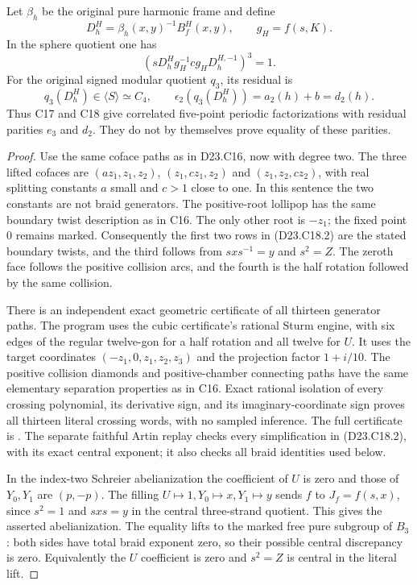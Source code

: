 Let $\beta_h$ be the original pure harmonic frame and define
\[
 D^H_h=\beta_h(x,y)^{-1}B^H_f(x,y),\qquad g_H=f(s,K).
\]
In the sphere quotient one has
\[
 \boxed{\quad
 (sD^H_hg_H^{-1}c g_HD^{H,-1}_h)^3=1.
 \quad}
\tag{D23.C18.5}
\]
For the original signed modular quotient $q_3$, its residual is
\[
 q_3(D^H_h)\in\langle S\rangle\simeq C_4,
 \qquad
 \epsilon_2(q_3(D^H_h))=a_2(h)+b=d_2(h).
\tag{D23.C18.6}
\]
Thus C17 and C18 give correlated five-point periodic
factorizations with residual parities $e_3$ and $d_2$.
They do not by themselves prove equality of these parities.

\begin{proof}
Use the same coface paths as in D23.C16, now with degree two.
The three lifted cofaces are
$(az_1,z_1,z_2)$, $(z_1,cz_1,z_2)$ and
$(z_1,z_2,cz_2)$, with real splitting constants $a$ small and
$c>1$ close to one. In this sentence the two constants are not
braid generators. The positive-root lollipop has the same
boundary twist description as in C16. The only other root
is $-z_1$; the fixed point $0$ remains marked. Consequently
the first two rows in (D23.C18.2) are the stated boundary
twists, and the third follows from $sxs^{-1}=y$ and $s^2=Z$.
The zeroth face follows the positive collision arcs, and the
fourth is the half rotation followed by the same collision.

There is an independent exact geometric certificate of all
thirteen generator paths. The program
 uses the cubic
certificate's rational Sturm engine, with six edges of the
regular twelve-gon for a half rotation and all twelve for $U$.
It uses the target coordinates $(-z_1,0,z_1,z_2,z_3)$ and the
projection factor $1+i/10$. The positive collision diamonds
and positive-chamber connecting paths have the same elementary
separation properties as in C16. Exact rational isolation of
every crossing polynomial, its derivative sign, and its
imaginary-coordinate sign proves all thirteen literal crossing
words, with no sampled inference. The full certificate is
.
The separate faithful Artin replay
checks every simplification in (D23.C18.2), with its exact
central exponent; it also checks all braid identities used below.

In the index-two Schreier abelianization the coefficient of $U$
is zero and those of $Y_0,Y_1$ are $(p,-p)$.
The filling $U\mapsto1,Y_0\mapsto x,Y_1\mapsto y$ sends $f$
to $J_f=f(s,x)$, since $s^2=1$ and $sxs=y$ in the central
three-strand quotient. This gives the asserted abelianization.
The equality lifts to the marked free pure subgroup of $B_3$:
both sides have total braid exponent zero, so their possible
central discrepancy is zero. Equivalently the $U$ coefficient
is zero and $s^2=Z$ is central in the literal lift.


\end{proof}
